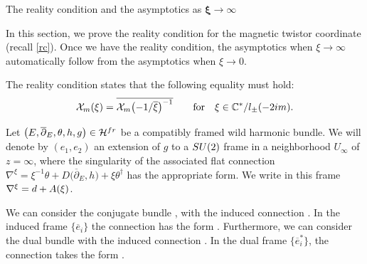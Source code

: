 \documentclass[11pt]{article}
\numberwithin{equation}{section}
\numberwithin{equation}{section}
\newcommand{\CP}{\mathbb{C}P^1}
\begin{document}
\begin{subsubsection}{The reality condition and the asymptotics as $\boldsymbol{\xi \to \infty}$}

In this section, we prove the reality condition for the magnetic twistor coordinate (recall \eqref{rc}). Once we have the reality condition, the asymptotics when $\xi \to \infty$ automatically follow from the asymptotics when $\xi \to 0$.

The reality condition states that the following equality must hold:
\begin{equation*}
\mathcal{X}_m(\xi)=\overline{\mathcal{X}_m\bigl(-1/\overline{\xi}\bigr)^{-1}} \qquad \text{for} \quad \xi \in \mathbb{C
 }^*/l_{\pm}(-2{\rm i}m).
\end{equation*}

Let $\bigl(E,\overline{\partial}_E, \theta, h,g\bigr) \in \mathcal{H}^{{\rm fr}}$ be a compatibly framed wild harmonic bundle. We will denote by $(e_1,e_2)$ an extension of $g$ to a ${\rm SU}(2)$ frame in a neighborhood $U_{\infty}$ of $z=\infty$, where the singularity of the associated flat connection $\nabla^{\xi}=\xi^{-1}\theta + D\bigl(\overline{\partial}_E,h\bigr) + \xi \theta^{\dagger}$ has the appropriate form. We write in this frame $\nabla^{\xi}={\rm d}+A(\xi)$.

We can consider the conjugate bundle \smash{$\overline{E}\to \overline{\CP}$}, with the induced connection \smash{$\overline{\nabla^{\xi}}$}. In the induced frame $\{\overline{e}_i\}$ the connection has the form . Furthermore, we can consider the dual bundle \smash{$\overline{E}^{*}\to \overline{\CP}$} with the induced connection \smash{$\overline{\nabla^{\xi}}^*$}. In the dual frame $\{\overline{e}^*_i\}$, the connection \smash{$\overline{\nabla^{\xi}}^{*}$} takes the form .


\end{subsubsection}
\end{document}
